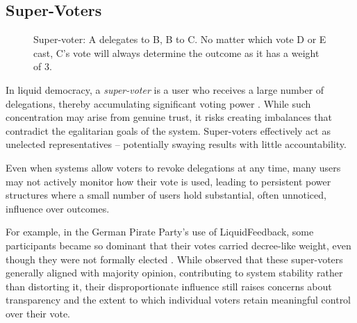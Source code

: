 \subsection*{Super-Voters}\label{subsec:bg_supervoter}
\begin{figure}[H]
  \centering
  \caption{Super-voter: A delegates to B, B to C. No matter which vote D or E cast, C's vote will always determine the outcome as it has a weight of 3.}
  \label{fig:delegation-supervoter}
\end{figure}

In liquid democracy, a \textit{super-voter} is a user who receives a large number of delegations, thereby accumulating significant voting power \citep{kling2015votingbehaviourpoweronline}. While such concentration may arise from genuine trust, it risks creating imbalances that contradict the egalitarian goals of the system. Super-voters effectively act as unelected representatives -- potentially swaying results with little accountability.

Even when systems allow voters to revoke delegations at any time, many users may not actively monitor how their vote is used, leading to persistent power structures where a small number of users hold substantial, often unnoticed, influence over outcomes.

For example, in the German Pirate Party's use of LiquidFeedback, some participants became so dominant that their votes carried decree-like weight, even though they were not formally elected \citep{sven_becker_liquid_2012, kling2015votingbehaviourpoweronline}. While \citet{kling2015votingbehaviourpoweronline} observed that these super-voters generally aligned with majority opinion, contributing to system stability rather than distorting it, their disproportionate influence still raises concerns about transparency and the extent to which individual voters retain meaningful control over their vote.

